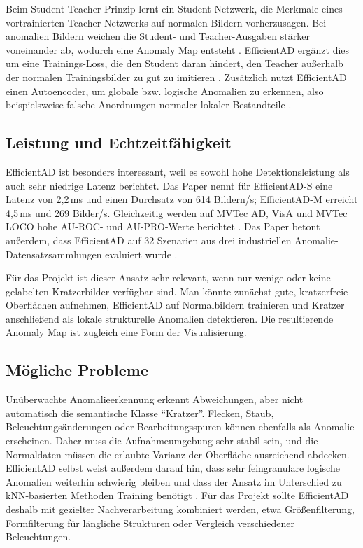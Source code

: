 \documentclass[11pt,a4paper]{article}
\begin{document}
Beim Student-Teacher-Prinzip lernt ein Student-Netzwerk, die Merkmale eines vortrainierten Teacher-Netzwerks auf normalen Bildern vorherzusagen. Bei anomalien Bildern weichen die Student- und Teacher-Ausgaben stärker voneinander ab, wodurch eine Anomaly Map entsteht \cite{efficientad}. EfficientAD ergänzt dies um eine Trainings-Loss, die den Student daran hindert, den Teacher außerhalb der normalen Trainingsbilder zu gut zu imitieren \cite{efficientad}. Zusätzlich nutzt EfficientAD einen Autoencoder, um globale bzw. logische Anomalien zu erkennen, also beispielsweise falsche Anordnungen normaler lokaler Bestandteile \cite{efficientad}.

\subsection{Leistung und Echtzeitfähigkeit}

EfficientAD ist besonders interessant, weil es sowohl hohe Detektionsleistung als auch sehr niedrige Latenz berichtet. Das Paper nennt für EfficientAD-S eine Latenz von 2{,}2\,ms und einen Durchsatz von 614 Bildern/s; EfficientAD-M erreicht 4{,}5\,ms und 269 Bilder/s. Gleichzeitig werden auf MVTec AD, VisA und MVTec LOCO hohe AU-ROC- und AU-PRO-Werte berichtet \cite{efficientad_results}. Das Paper betont außerdem, dass EfficientAD auf 32 Szenarien aus drei industriellen Anomalie-Datensatzsammlungen evaluiert wurde \cite{efficientad}. 

Für das Projekt ist dieser Ansatz sehr relevant, wenn nur wenige oder keine gelabelten Kratzerbilder verfügbar sind. Man könnte zunächst gute, kratzerfreie Oberflächen aufnehmen, EfficientAD auf Normalbildern trainieren und Kratzer anschließend als lokale strukturelle Anomalien detektieren. Die resultierende Anomaly Map ist zugleich eine Form der Visualisierung.

\subsection{Mögliche Probleme}

Unüberwachte Anomalieerkennung erkennt Abweichungen, aber nicht automatisch die semantische Klasse \enquote{Kratzer}. Flecken, Staub, Beleuchtungsänderungen oder Bearbeitungsspuren können ebenfalls als Anomalie erscheinen. Daher muss die Aufnahmeumgebung sehr stabil sein, und die Normaldaten müssen die erlaubte Varianz der Oberfläche ausreichend abdecken. EfficientAD selbst weist außerdem darauf hin, dass sehr feingranulare logische Anomalien weiterhin schwierig bleiben und dass der Ansatz im Unterschied zu kNN-basierten Methoden Training benötigt \cite{efficientad_results}. Für das Projekt sollte EfficientAD deshalb mit gezielter Nachverarbeitung kombiniert werden, etwa Größenfilterung, Formfilterung für längliche Strukturen oder Vergleich verschiedener Beleuchtungen.
\end{document}
